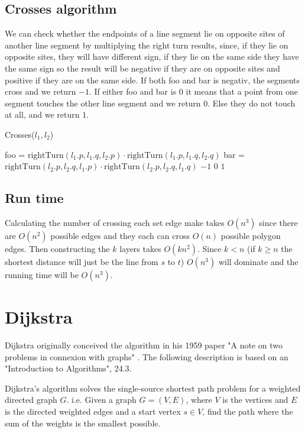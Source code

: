 \subsection{Crosses algorithm}
We can check whether the endpoints of a line segment lie on opposite sites of another
line segment by multiplying the right turn results, since, if they lie on opposite sites,
they will have different sign, if they lie on the same side they have the same
sign so the result will be negative if they are on opposite sites and positive
if they are on the same side. If both foo and bar is negativ, the segments
cross and we return $-1$. If either foo and bar is $0$ it means that a point from
one segment touches the other line segment and we return $0$. Else they do not
touch at all, and we return $1$.
\begin{algorithm}[H]
	\caption{Crosses($l_1,l_2$)}
	\begin{algorithmic}[1] 
		\State foo = $\text{rightTurn}(l_1.p,l_1.q,l_2.p)\cdot
		\text{rightTurn}(l_1.p,l_1.q,l_2.q)$
		\State bar = $\text{rightTurn}(l_2.p,l_2.q,l_1.p)\cdot
		\text{rightTurn}(l_2.p,l_2.q,l_1.q)$
		\State \Return $-1$
		\State \Return $0$
		\Else
		\State \Return $1$
		\EndIf
	\end{algorithmic}
\end{algorithm}

\subsection{Run time}
Calculating the number of crossing each set edge make takes $O(n^3)$ since
there are $O(n^2)$ possible edges and they each can cross $O(n)$ possible
polygon edges. Then constructing the $k$ layers takes $O(k n^2)$. Since $k<n$
(if $k\geq n$ the shortest distance will just be the line from $s$ to $t$)
$O(n^3)$ will dominate and the running time will be $O(n^3)$.

\section{Dijkstra}

Dijkstra originally conceived the algorithm in his 1959 paper "A note on two
problems in connexion with graphs" \cite{dijkstra59}.  The following
description is based on an "Introduction to Algorithms"\cite{IntroToAlg}, 24.3.

Dijkstra's algorithm solves the single-source shortest path problem for a
weighted directed graph $G$. i.e. Given a graph $G=(V,E)$, where $V$ is the
vertices and $E$ is the directed weighted edges and a start vertex $s\in V$,
find the path where the sum of the weights is the smallest possible.

